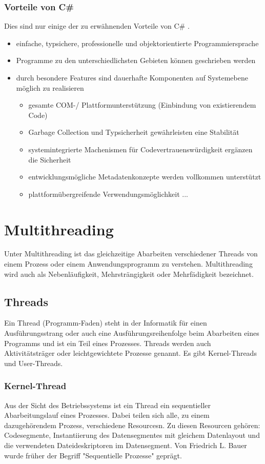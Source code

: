 \documentclass[12pt,a4paper]{report}
\begin{document}
\subsubsection{Vorteile von C\#}
Dies sind nur einige der zu erwähnenden Vorteile von C\# .
\begin{itemize}
\item einfache, typsichere, professionelle und objektorientierte Programmiersprache
\item Programme zu den unterschiedlichsten Gebieten können geschrieben werden
\item durch besondere Features sind dauerhafte Komponenten auf Systemebene möglich zu realisieren
\begin{itemize}
\item gesamte COM-/ Plattformunterstützung (Einbindung von existierendem Code)
\item Garbage Collection und Typsicherheit gewährleisten eine Stabilität
\item systemintegrierte Machenismen für Codevertrauenswürdigkeit ergänzen die Sicherheit
\item entwicklungsmögliche Metadatenkonzepte werden vollkommen unterstützt
\item plattformübergreifende Verwendungsmöglichkeit ...
\end{itemize}
\end{itemize}

\section{Multithreading}
Unter Multithreading ist das gleichzeitige Abarbeiten verschiedener Threads von einem Prozess oder einem Anwendungsprogramm zu verstehen. Multithreading wird auch als Nebenläufigkeit, Mehrsträngigkeit oder Mehrfädigkeit bezeichnet.

\subsection{Threads}
Ein Thread (Programm-Faden) steht in der Informatik für einen Ausführungsstrang oder auch eine Ausführungsreihenfolge beim Abarbeiten eines Programms und ist ein Teil eines Prozesses. Threads werden auch Aktivitätsträger oder leichtgewichtete Prozesse genannt. Es gibt Kernel-Threads und User-Threads.

\subsubsection{Kernel-Thread}
Aus der Sicht des Betriebssystems ist ein Thread ein sequentieller Abarbeitungslauf eines Prozesses. Dabei teilen sich alle, zu einem dazugehörendem Prozess, verschiedene Resourcesn. Zu diesen Resourcen gehören: Codesegmente, Instantiierung des Datensegmentes mit gleichem Datenlayout und die verwendeten Dateideskriptoren im Datensegment. Von Friedrich L. Bauer wurde früher der Begriff "Sequentielle Prozesse" geprägt.\\
\end{document}

